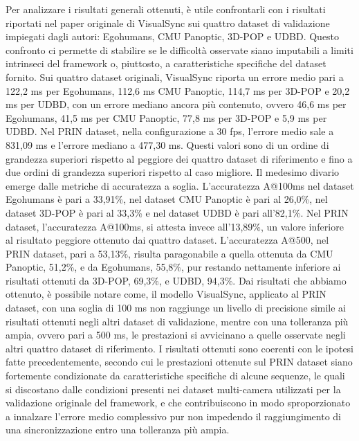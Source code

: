 Per analizzare i risultati generali ottenuti, è utile confrontarli con i risultati riportati nel paper originale di VisualSync \cite{visualsync} sui quattro dataset di validazione impiegati dagli autori: Egohumans, CMU Panoptic, 3D-POP e UDBD. Questo confronto ci permette di stabilire se le difficoltà osservate siano imputabili a limiti intrinseci del framework o, piuttosto, a caratteristiche specifiche del dataset fornito.
Sui quattro dataset originali, VisualSync riporta un errore medio pari a 122,2 ms per Egohumans, 112,6 ms CMU Panoptic, 114,7 ms per 3D-POP e 20,2 ms per UDBD, con un errore mediano ancora più contenuto, ovvero 46,6 ms per Egohumans, 41,5 ms per CMU Panoptic, 77,8 ms per 3D-POP e 5,9 ms per UDBD. Nel PRIN dataset, nella configurazione a 30 fps, l'errore medio sale a 831,09 ms e l'errore mediano a 477,30 ms. Questi valori sono di un ordine di grandezza superiori rispetto al peggiore dei quattro dataset di riferimento e fino a due ordini di grandezza superiori rispetto al caso migliore.
Il medesimo divario emerge dalle metriche di accuratezza a soglia. L'accuratezza A@100ms nel dataset Egohumans è pari a 33,91\%, nel dataset CMU Panoptic è pari al 26,0\%, nel dataset 3D-POP è pari al 33,3\% e nel dataset UDBD è pari all'82,1\%. Nel PRIN dataset, l'accuratezza A@100ms, si attesta invece all'13,89\%, un valore inferiore al risultato peggiore ottenuto dai quattro dataset. L'accuratezza A@500, nel PRIN dataset, pari a 53,13\%, risulta paragonabile a quella ottenuta da CMU Panoptic, 51,2\%, e da Egohumans, 55,8\%, pur restando nettamente inferiore ai risultati ottenuti da 3D-POP, 69,3\%, e UDBD, 94,3\%.
Dai risultati che abbiamo ottenuto, è possibile notare come, il modello VisualSync, applicato al PRIN dataset, con una soglia di 100 ms non raggiunge un livello di precisione simile ai risultati ottenuti negli altri dataset di validazione, mentre con una tolleranza più ampia, ovvero pari a 500 ms, le prestazioni si avvicinano a quelle osservate negli altri quattro dataset di riferimento. I risultati ottenuti sono coerenti con le ipotesi fatte precedentemente, secondo cui le prestazioni ottenute sul PRIN dataset siano fortemente condizionate da caratteristiche specifiche di alcune sequenze, le quali si discostano dalle condizioni presenti nei dataset multi-camera utilizzati per la validazione originale del framework, e che contribuiscono in modo sproporzionato a innalzare l'errore medio complessivo pur non impedendo il raggiungimento di una sincronizzazione entro una tolleranza più ampia.

